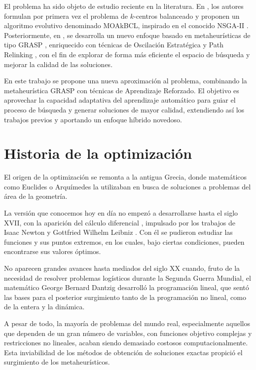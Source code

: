 \documentclass[12pt,a4paper]{book}
\begin{document}
El problema ha sido objeto de estudio reciente en la literatura. En \citet{k-balanced_1}, los autores formulan por primera vez el problema de $k$-centros balanceado y proponen un algoritmo evolutivo denominado MOAkBCL, inspirado en el conocido NSGA-II \cite{NSGA-II}. Posteriormente, en \citet{k-Balanced_2}, se desarrolla un nuevo enfoque basado en metaheurísticas de tipo GRASP \cite{GRASP}, enriquecido con técnicas de Oscilación Estratégica \cite{oscillation} y Path Relinking \cite{path_relinking}, con el fin de explorar de forma más eficiente el espacio de búsqueda y mejorar la calidad de las soluciones.

En este trabajo se propone una nueva aproximación al problema, combinando la metaheurística GRASP con técnicas de Aprendizaje Reforzado. El objetivo es aprovechar la capacidad adaptativa del aprendizaje automático para guiar el proceso de búsqueda y generar soluciones de mayor calidad, extendiendo así los trabajos previos y aportando un enfoque híbrido novedoso.

\section{Historia de la optimización}
El origen de la optimización se remonta a la antigua Grecia, donde matemáticos como Euclides o Arquímedes la utilizaban en busca de soluciones a problemas del área de la geometría.

La versión que conocemos hoy en día no empezó a desarrollarse hasta el siglo XVII, con la aparición del cálculo diferencial \cite{calculo_diferencial}, impulsado por los trabajos de Isaac Newton y Gottfried Wilhelm Leibniz \cite{Leibniz}. Con él se pudieron estudiar las funciones y sus puntos extremos,
en los cuales, bajo ciertas condiciones, pueden encontrarse sus valores óptimos.

No aparecen grandes avances hasta mediados del siglo XX cuando, fruto de la necesidad de resolver problemas logísticos durante la Segunda Guerra Mundial, el matemático George Bernard Dantzig \cite{Dantzig} desarrolló la programación lineal, que sentó las bases para el posterior surgimiento tanto de la programación no lineal, como de la entera y la dinámica.

A pesar de todo, la mayoría de problemas del mundo real, especialmente aquellos que dependen de un gran número de variables, con funciones objetivo complejas y restricciones no lineales, acaban siendo demasiado costosos computacionalmente. Esta inviabilidad de los métodos de obtención de soluciones exactas propició el surgimiento de los metaheurísticos.
\end{document}
